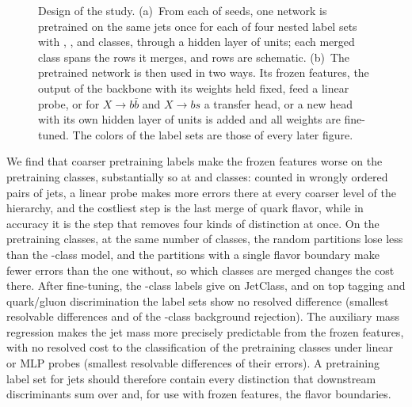 \begin{figure}[tbp]
\centering
{}
\caption{Design of the study. (a)~From each of \MlstNRunsWord{} seeds, one network is pretrained on the same
jets once for each of four nested label sets with \Kfull, \Kres, \Kmid{} and \Kcoarse{} classes, through a hidden layer of
\DesignHeadHidden{} units; each merged class spans the rows it merges, and rows are schematic. (b)~The pretrained network is then used in two ways. Its frozen
features, the output of the backbone with its weights held fixed, feed a linear probe, or for $X\to b\bar b$ and
$X\to bs$ a transfer head, or a new head with its own hidden layer of \DesignHeadHidden{} units is added and all
weights are fine-tuned. The colors of
the label sets are those of every later figure.}
\label{fig:design}
\end{figure}

We find that coarser pretraining labels make the frozen features worse on the pretraining classes, substantially so at \Kmid{} and \Kcoarse{} classes: counted in wrongly ordered pairs of jets, a linear probe
makes more errors there at every coarser level of the hierarchy, and the costliest step is the last merge of quark
flavor, while in accuracy it is the step that removes four kinds of distinction at once. On the pretraining classes, at the same number of classes, the random partitions lose less than
the \Kcoarse-class model, and the partitions with a single flavor boundary make fewer errors than the one without, so which classes are
merged changes the cost there. After fine-tuning, the \Kcoarse-class labels give 
on JetClass, and on top tagging and quark/gluon discrimination the label sets show no resolved difference
(smallest resolvable differences \MlstPwRthirtyFtTop{} and \MlstPwRthirtyFtQg{} of the \Kfull-class background
rejection). The auxiliary mass regression makes the jet mass more precisely predictable from the frozen features,
with no resolved cost to the classification of the pretraining classes under linear or MLP probes (smallest
resolvable differences \MlstPwMassClsAll{} of their errors). A pretraining label set for jets should therefore contain every distinction that
downstream discriminants sum over and, for use with frozen features, the flavor boundaries.

